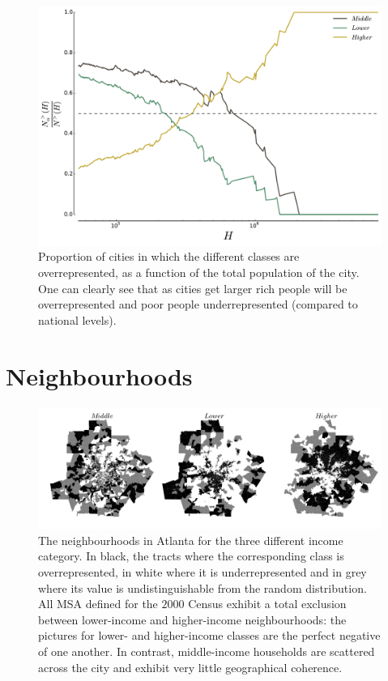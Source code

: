 \begin{figure}
    \centering
    \includegraphics[width=\textwidth]{gfx/chapter-segregation/figure3.pdf}
    \caption{Proportion of cities in which the different classes are
    overrepresented, as a function of the total population of the city. One can
    clearly see that as cities get larger rich people will
    be overrepresented and poor people underrepresented (compared to national
    levels). \label{fig:inter-urban_representation}}
\end{figure}




\section{Neighbourhoods}
\label{sec:neighbourhoods}



\begin{figure}
    \centering
    \includegraphics[width=\textwidth]{./gfx/chapter-segregation/figure2.png}
    \caption{The neighbourhoods in Atlanta for the three different
      income category. In black, the tracts where the corresponding
      class is overrepresented, in white where it is
      underrepresented and in grey where its value is
      undistinguishable from the random distribution. All
      MSA defined for the $2000$ Census exhibit a total exclusion between
      lower-income and higher-income
      neighbourhoods: the pictures for lower- and higher-income classes are the
      perfect negative of one another. In contrast, middle-income households
      are scattered across the city and exhibit very little geographical coherence.}
\label{fig:atlanta_neighbourhoods}
\end{figure}


